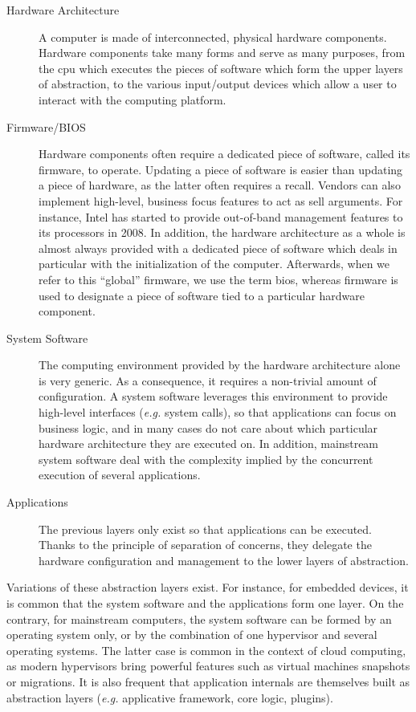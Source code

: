 \begin{description}
\item [Hardware Architecture]
  A computer is made of interconnected, physical hardware components.
  Hardware components take many forms and serve as many purposes, from the
  \ac{cpu} which executes the pieces of software which form the upper layers of
  abstraction, to the various input/output devices which allow a user to
  interact with the computing platform.
\item [Firmware/BIOS]
  Hardware components often require a dedicated piece of software, called its
  firmware, to operate.
  Updating a piece of software is easier than updating a piece of hardware, as
  the latter often requires a recall.
  Vendors can also implement high-level, business focus features to act as sell
  arguments.
  For instance, Intel has started to provide out-of-band management features to
  its processors in 2008.
  In addition, the hardware architecture as a whole is almost always provided
  with a dedicated piece of software which deals in particular with the
  initialization of the computer.
  Afterwards, when we refer to this ``global'' firmware, we use the term
  \ac{bios}, whereas firmware is used to designate a piece of software tied to a
  particular hardware component.
\item [System Software]
  The computing environment provided by the hardware architecture alone is very
  generic.
  As a consequence, it requires a non-trivial amount of configuration.
  A system software leverages this environment to provide high-level interfaces
  (\emph{e.g.} system calls), so that applications can focus on business logic,
  and in many cases do not care about which particular hardware architecture
  they are executed on.
  In addition, mainstream system software deal with the complexity implied by
  the concurrent execution of several applications.
\item [Applications]
  The previous layers only exist so that applications can be executed.
  Thanks to the principle of separation of concerns, they delegate the hardware
  configuration and management to the lower layers of abstraction.
\end{description}

Variations of these abstraction layers exist.
%
For instance, for embedded devices, it is common that the system software and
the applications form one layer.
%
On the contrary, for mainstream computers, the system software can be formed by
an operating system only, or by the combination of one hypervisor and several
operating systems.
%
The latter case is common in the context of cloud computing, as modern
hypervisors bring powerful features such as virtual machines snapshots or
migrations.
%
It is also frequent that application internals are themselves built as
abstraction layers (\emph{e.g.} applicative framework, core logic, plugins).

